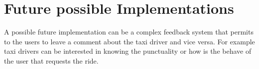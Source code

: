\documentclass{report}
\begin{document}
	\section{Future possible Implementations}
	A possible future implementation can be a complex feedback system that permits to the users to leave a comment about the taxi driver and vice versa.
	For example taxi drivers can be interested in knowing the punctuality or how is the behave of the user that requests the ride.
\end{document}
